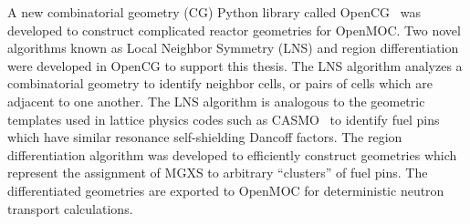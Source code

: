 \documentclass[12pt,twoside]{mitthesis-exec}
\begin{document}
A new combinatorial geometry (CG) Python library called OpenCG~\cite{boyd2015opencg} was developed to construct complicated reactor geometries for OpenMOC. Two novel algorithms known as Local Neighbor Symmetry (LNS) and region differentiation were developed in OpenCG to support this thesis. The LNS algorithm analyzes a combinatorial geometry to identify neighbor cells, or pairs of cells which are adjacent to one another. The LNS algorithm is analogous to the geometric templates used in lattice physics codes such as CASMO~\cite{edenius1995casmo} to identify fuel pins which have similar resonance self-shielding Dancoff factors. The region differentiation algorithm was developed to efficiently construct geometries which represent the assignment of MGXS to arbitrary ``clusters'' of fuel pins. The differentiated geometries are exported to OpenMOC for deterministic neutron transport calculations. 



%
%
%
%
%
%
\end{document}
